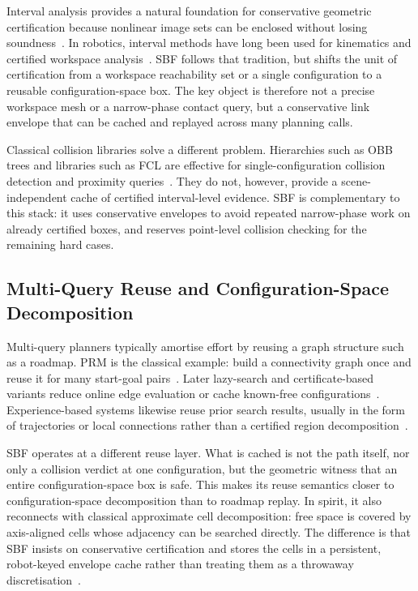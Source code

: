\documentclass[journal]{IEEEtran}
\begin{document}
Interval analysis provides a natural foundation for conservative geometric
certification because nonlinear image sets can be enclosed without losing
soundness~\cite{moore2009introduction,jaulin2001applied}. In robotics, interval
methods have long been used for kinematics and certified workspace
analysis~\cite{merlet2004solving,merlet2006interval}. SBF follows that
tradition, but shifts the unit of certification from a workspace reachability
set or a single configuration to a reusable configuration-space box. The key
object is therefore not a precise workspace mesh or a narrow-phase contact
query, but a conservative link envelope that can be cached and replayed across
many planning calls.

Classical collision libraries solve a different problem. Hierarchies such as
OBB trees and libraries such as FCL are effective for single-configuration
collision detection and proximity queries~\cite{gottschalk1996obbtree,
pan2012fcl,gilbert1988fast}. They do not, however, provide a scene-independent
cache of certified interval-level evidence. SBF is complementary to this stack:
it uses conservative envelopes to avoid repeated narrow-phase work on already
certified boxes, and reserves point-level collision checking for the remaining
hard cases.

\subsection{Multi-Query Reuse and Configuration-Space Decomposition}

Multi-query planners typically amortise effort by reusing a graph structure such
as a roadmap. PRM is the classical example: build a connectivity graph once and
reuse it for many start-goal pairs~\cite{kavraki1996probabilistic,
bohlin2000path}. Later lazy-search and certificate-based variants reduce online
edge evaluation or cache known-free configurations~\cite{dellin2016unifying,
schmerling2015optimal}. Experience-based systems likewise reuse prior search
results, usually in the form of trajectories or local connections rather than a
certified region decomposition~\cite{coleman2014moveit}.

SBF operates at a different reuse layer. What is cached is not the path itself,
nor only a collision verdict at one configuration, but the geometric witness
that an entire configuration-space box is safe. This makes its reuse semantics
closer to configuration-space decomposition than to roadmap replay. In spirit,
it also reconnects with classical approximate cell decomposition: free space is
covered by axis-aligned cells whose adjacency can be searched directly.
The difference is that SBF insists on conservative certification and stores the
cells in a persistent, robot-keyed envelope cache rather than treating them as a
throwaway discretisation~\cite{lozanoperez1983spatial,brooks1985subdivision}.
\end{document}
